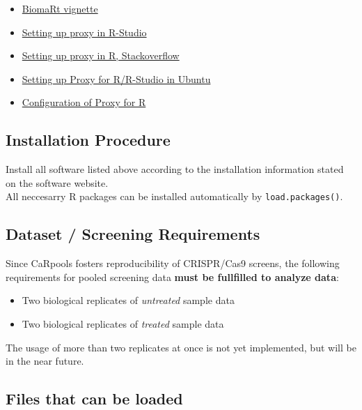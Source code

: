 \documentclass[]{article}
\providecommand{\tightlist}{%
  \setlength{\itemsep}{0pt}\setlength{\parskip}{0pt}}
\begin{document}
\begin{itemize}
\tightlist
\item
  \href{http://www.bioconductor.org/packages/release/bioc/vignettes/biomaRt/inst/doc/biomaRt.pdf}{BiomaRt
  vignette}
\item
  \href{https://support.rstudio.com/hc/en-us/articles/200488488-Configuring-R-to-Use-an-HTTP-Proxy}{Setting
  up proxy in R-Studio}
\item
  \href{http://stackoverflow.com/questions/6467277/proxy-setting-for-r}{Setting
  up proxy in R, Stackoverflow}
\item
  \href{http://askubuntu.com/questions/572722/setting-up-the-proxy-for-rstudio}{Setting
  up Proxy for R/R-Studio in Ubuntu}
\item
  \href{https://bhoom.wordpress.com/2013/05/27/configuring-r-to-use-an-http-proxy-faq-knowledge-base-rstudio-support/}{Configuration
  of Proxy for R}
\end{itemize}

\subsection{Installation Procedure}\label{installation-procedure}

Install all software listed above according to the installation
information stated on the software website.\\
All neccesarry R packages can be installed automatically by
\texttt{load.packages()}.

\subsection{Dataset / Screening
Requirements}\label{dataset-screening-requirements}

Since CaRpools fosters reproducibility of CRISPR/Cas9 screens, the
following requirements for pooled screening data \textbf{must be
fullfilled to analyze data}:

\begin{itemize}
\tightlist
\item
  Two biological replicates of \emph{untreated} sample data
\item
  Two biological replicates of \emph{treated} sample data
\end{itemize}

The usage of more than two replicates at once is not yet implemented,
but will be in the near future.

\subsection{Files that can be loaded}\label{files-that-can-be-loaded}
\end{document}
